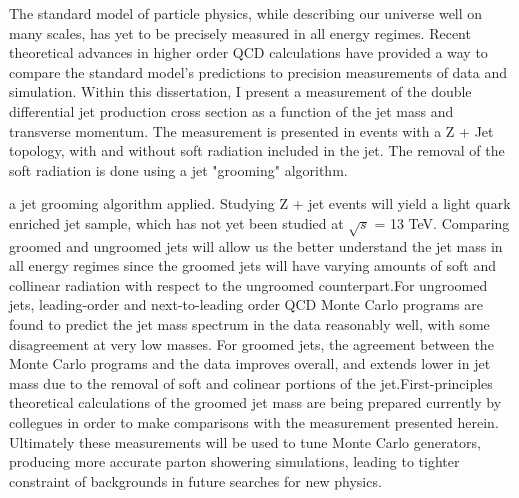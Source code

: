 
The standard model of particle physics, while describing our universe well on many scales, has yet to be precisely measured in all energy regimes. Recent theoretical advances in higher order QCD calculations have provided a way to compare the standard model's predictions to precision measurements of data and simulation. Within this dissertation, I present a measurement of the double differential jet production cross section as a function of the jet mass and transverse momentum. The measurement is presented in events with a Z + Jet topology, with and without soft radiation included in the jet. The removal of the soft radiation is done using a jet "grooming" algorithm.


 a jet grooming algorithm applied. Studying Z + jet events will yield a light quark enriched jet sample, which has not yet been studied at $\sqrt{s}$ = 13 TeV. Comparing groomed and ungroomed jets will allow us the better understand the jet mass in all energy regimes since the groomed jets will have varying amounts of soft and collinear radiation with respect to the ungroomed counterpart.For ungroomed jets, leading-order and next-to-leading order QCD Monte Carlo programs are found to predict the jet mass spectrum in the data reasonably well, with some disagreement at very low masses. For groomed jets, the agreement between the Monte Carlo programs and the data improves overall, and extends lower in jet mass due to the removal of soft and colinear portions of the jet.First-principles theoretical calculations of the groomed jet mass are being prepared currently by collegues in order to make comparisons with the measurement presented herein. Ultimately these measurements will be used to tune Monte Carlo generators, producing more accurate parton showering simulations, leading to tighter constraint of backgrounds in future searches for new physics.

